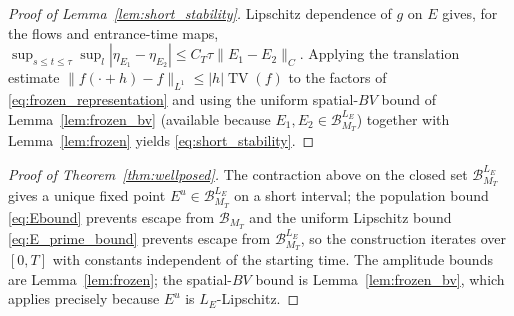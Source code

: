 \documentclass[pdflatex,sn-mathphys-num]{sn-jnl}
\DeclareMathOperator{\TV}{TV}
\theoremstyle{plain}
\theoremstyle{definition}
\theoremstyle{remark}
\begin{document}
\begin{proof}[Proof of Lemma~\ref{lem:short_stability}]
Lipschitz dependence of $g$ on $E$ gives, for the flows and entrance-time maps,
$\sup_{s\le t\le\tau}\sup_l|\eta_{E_1}-\eta_{E_2}|\le C_T\tau\|E_1-E_2\|_{C}$.
Applying the translation estimate $\|f(\cdot+h)-f\|_{L^1}\le|h|\TV(f)$ to the
factors of \eqref{eq:frozen_representation} and using the uniform spatial-$BV$
bound of Lemma~\ref{lem:frozen_bv} (available because
$E_1,E_2\in\mathcal B_{M_T}^{L_E}$) together with Lemma~\ref{lem:frozen} yields
\eqref{eq:short_stability}.
\end{proof}

\begin{proof}[Proof of Theorem~\ref{thm:wellposed}]
The contraction above on the closed set $\mathcal B_{M_T}^{L_E}$ gives a unique
fixed point $E^u\in\mathcal B_{M_T}^{L_E}$ on a short interval; the population
bound \eqref{eq:Ebound} prevents escape from $\mathcal B_{M_T}$ and the uniform
Lipschitz bound \eqref{eq:E_prime_bound} prevents escape from
$\mathcal B_{M_T}^{L_E}$, so the construction iterates over $[0,T]$ with constants
independent of the starting time. The amplitude bounds are
Lemma~\ref{lem:frozen}; the spatial-$BV$ bound is Lemma~\ref{lem:frozen_bv},
which applies precisely because $E^u$ is $L_E$-Lipschitz.
\end{proof}
\end{document}
